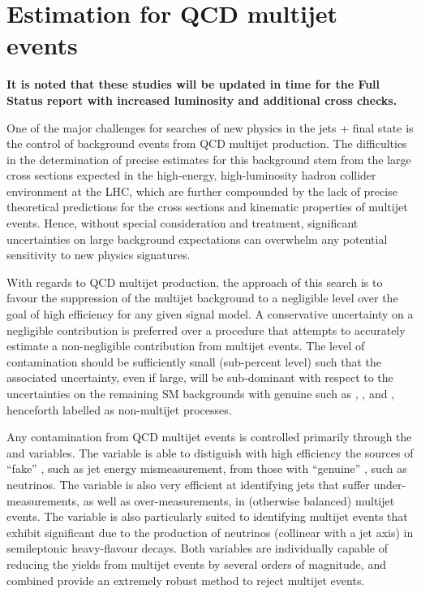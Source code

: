 
\def\rmhtmet{\mbox{$\mathcal{R}$}\xspace}

\section{Estimation for QCD multijet events \label{sec:qcd}}

{\bf It is noted that these studies will be updated in time for the
  Full Status report with increased luminosity and additional cross
  checks. }

One of the major challenges for searches of new physics in the jets +
\met final state is the control of background events from QCD multijet
production. The difficulties in the determination of precise estimates
for this background stem from the large cross sections expected in the
high-energy, high-luminosity hadron collider environment at the LHC,
which are further compounded by the lack of precise theoretical
predictions for the cross sections and kinematic properties of
multijet events. Hence, without special consideration and treatment,
significant uncertainties on large background expectations can
overwhelm any potential sensitivity to new physics signatures.

With regards to QCD multijet production, the approach of this search
is to favour the suppression of the multijet background to a
negligible level over the goal of high efficiency for any given signal
model. A conservative uncertainty on a negligible contribution is
preferred over a procedure that attempts to accurately estimate a
non-negligible contribution from multijet events. The level of
contamination should be sufficiently small (\ie sub-percent level)
such that the associated uncertainty, even if large, will be
sub-dominant with respect to the uncertainties on the remaining SM
backgrounds with genuine \met such as \wj, \znunu, and \ttbar,
henceforth labelled as non-multijet processes.

Any contamination from QCD multijet events is controlled primarily
through the \alphat and \bdphi variables. The \alphat variable is able
to distiguish with high efficiency the sources of ``fake'' \met, such
as jet energy mismeasurement, from those with ``genuine'' \met, such
as neutrinos. The \bdphi variable is also very efficient at
identifying jets that suffer under-measurements, as well as
over-measurements, in (otherwise balanced) multijet events. The
variable is also particularly suited to identifying multijet events
that exhibit significant \met due to the production of neutrinos
(collinear with a jet axis) in semileptonic heavy-flavour decays. Both
variables are individually capable of reducing the yields from
multijet events by several orders of magnitude, and combined provide
an extremely robust method to reject multijet events. 

